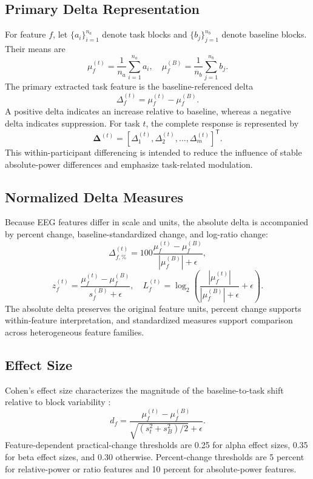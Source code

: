\documentclass[conference]{IEEEtran}
\begin{document}
\subsection{Primary Delta Representation}
For feature $f$, let $\{a_i\}_{i=1}^{n_a}$ denote task blocks and $\{b_j\}_{j=1}^{n_b}$ denote baseline blocks. Their means are
\begin{equation}
\mu_f^{(t)}=\frac{1}{n_a}\sum_{i=1}^{n_a}a_i,\quad
\mu_f^{(B)}=\frac{1}{n_b}\sum_{j=1}^{n_b}b_j.
\end{equation}
The primary extracted task feature is the baseline-referenced delta
\begin{equation}
\Delta_f^{(t)}=\mu_f^{(t)}-\mu_f^{(B)}.
\end{equation}
A positive delta indicates an increase relative to baseline, whereas a negative delta indicates suppression. For task $t$, the complete response is represented by
\begin{equation}
\boldsymbol{\Delta}^{(t)}
=\left[\Delta_1^{(t)},\Delta_2^{(t)},\ldots,\Delta_m^{(t)}\right]^\mathsf{T}.
\end{equation}
This within-participant differencing is intended to reduce the influence of stable absolute-power differences and emphasize task-related modulation.

\subsection{Normalized Delta Measures}
Because EEG features differ in scale and units, the absolute delta is accompanied by percent change, baseline-standardized change, and log-ratio change:
\begin{equation}
\Delta_{f,\%}^{(t)}
=100\frac{\mu_f^{(t)}-\mu_f^{(B)}}{|\mu_f^{(B)}|+\epsilon},
\end{equation}
\begin{equation}
z_f^{(t)}=\frac{\mu_f^{(t)}-\mu_f^{(B)}}{s_f^{(B)}+\epsilon},
\quad
L_f^{(t)}=\log_2\left(\frac{|\mu_f^{(t)}|}{|\mu_f^{(B)}|+\epsilon}+\epsilon\right).
\end{equation}
The absolute delta preserves the original feature units, percent change supports within-feature interpretation, and standardized measures support comparison across heterogeneous feature families.

\subsection{Effect Size}
Cohen's effect size characterizes the magnitude of the baseline-to-task shift relative to block variability \cite{cohen1988}:
\begin{equation}
d_f=\frac{\mu_f^{(t)}-\mu_f^{(B)}}{\sqrt{(s_t^2+s_B^2)/2}+\epsilon}.
\end{equation}
Feature-dependent practical-change thresholds are 0.25 for alpha effect sizes, 0.35 for beta effect sizes, and 0.30 otherwise. Percent-change thresholds are 5 percent for relative-power or ratio features and 10 percent for absolute-power features.
\end{document}
